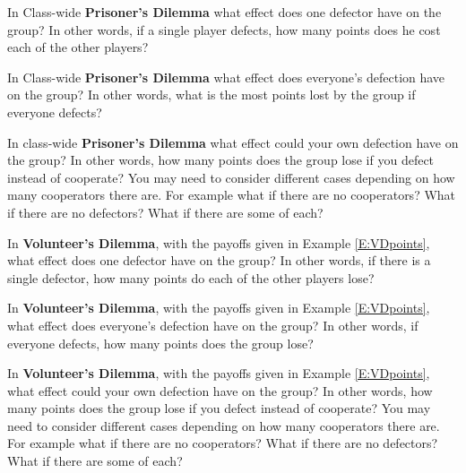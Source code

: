  
\begin{xca}\label{E:CWPDdefecteffect}
In Class-wide \textbf{Prisoner's Dilemma} what effect does one defector have on the group? In other words, if a single player defects, how many points does he cost each of the other players?
\end{xca}

\begin{xca}\label{E:CWPDalldefecteffect}
In Class-wide \textbf{Prisoner's Dilemma} what effect does everyone's defection have on the group? In other words, what is the most points lost by the group if everyone defects?
\end{xca}

\begin{xca}\label{E:CWPDowndefect} 
In class-wide \textbf{Prisoner's Dilemma} what effect could your own defection have on the group? In other words, how many points does the group lose if you defect instead of cooperate? You may need to consider different cases depending on how many cooperators there are. For example what if there are no cooperators? What if there are no defectors? What if there are some of each?
\end{xca}

\begin{xca}\label{E:VDdefecteffect} 
In \textbf{Volunteer's Dilemma}, with the payoffs given in Example \ref{E:VDpoints}, what effect does one defector have on the group? In other words, if there is a single defector, how many points do each of the other players lose?
\end{xca}

\begin{xca}\label{E:VDalldefecteffect} 
In \textbf{Volunteer's Dilemma}, with the payoffs given in Example \ref{E:VDpoints}, what effect does everyone's defection have on the group? In other words, if everyone defects, how many points does the group lose?
\end{xca}

\begin{xca}\label{E:VDowndefect} 
In {\bf Volunteer's Dilemma}, with the payoffs given in Example \ref{E:VDpoints}, what effect could your own defection have on the group? In other words, how many points does the group lose if you defect instead of cooperate? You may need to consider different cases depending on how many cooperators there are. For example what if there are no cooperators? What if there are no defectors? What if there are some of each?
\end{xca}

